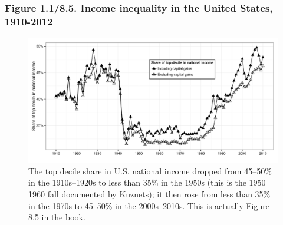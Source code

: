 \documentclass[t]{beamer}\usepackage[]{graphicx}\usepackage[]{color}
\newenvironment{knitrout}{}{} %
\begin{document}
\begin{frame}[label=Figure_8_5,fragile]
\frametitle{Figure 1.1/8.5. Income inequality in the United States, 1910-2012}
\begin{figure}[t]
\begin{minipage}[b]{\textwidth}
\centering
\begin{knitrout}\footnotesize
{}\color{fgcolor}

{\centering \includegraphics[width=1\linewidth]{figures/bw/Figure_8_5} 

}



\end{knitrout}
\caption{The top decile share in U.S. national income dropped from 45--50\% in the 1910s--1920s to less than 35\% in the 1950s (this is the
1950 1960 fall documented by Kuznets); it then rose from less than 35\% in the 1970s to 45--50\% in the 2000s--2010s. This is actually Figure 8.5 in the book.}
\end{minipage}
\end{figure}
\end{frame}
\end{document}

